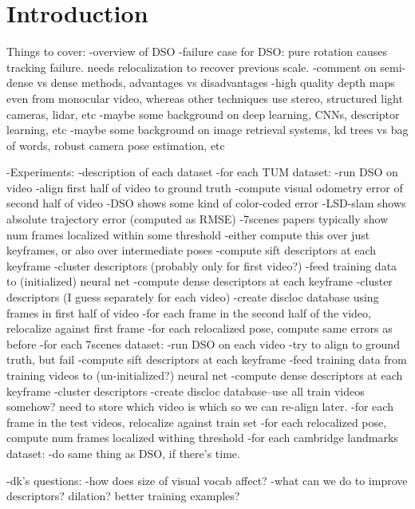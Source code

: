 \graphicspath{{introduction/}}

\chapter{Introduction}
\label{cha:introduction}


Things to cover:
-overview of DSO
-failure case for DSO: pure rotation causes tracking failure. needs relocalization to recover previous scale.
-comment on semi-dense vs dense methods, advantages vs disadvantages
	-high quality depth maps even from monocular video, whereas other techniques use stereo, structured light cameras, lidar, etc
-maybe some background on deep learning, CNNs, descriptor learning, etc
-maybe some background on image retrieval systems, kd trees vs bag of words, robust camera pose estimation, etc


-Experiments:
-description of each dataset
-for each TUM dataset:
	-run DSO on video
	-align first half of video to ground truth
	-compute visual odometry error of second half of video
		-DSO shows some kind of color-coded error
		-LSD-slam shows absolute trajectory error (computed as RMSE)
		-7scenes papers typically show num frames localized within some threshold
		-either compute this over just keyframes, or also over intermediate poses
	-compute sift descriptors at each keyframe
		-cluster descriptors (probably only for first video?)
	-feed training data to (initialized) neural net
	-compute dense descriptors at each keyframe
	    -cluster descriptors (I guess separately for each video)
	-create discloc database using frames in first half of video
    -for each frame in the second half of the video, relocalize against first frame
	    -for each relocalized pose, compute same errors as before
-for each 7scenes dataset:
	-run DSO on each video
	-try to align to ground truth, but fail
	-compute sift descriptors at each keyframe
	-feed training data from training videos to (un-initialized?) neural net
	-compute dense descriptors at each keyframe
	-cluster descriptors
	-create discloc database--use all train videos somehow? need to store which video is which so we can re-align later.
	-for each frame in the test videos, relocalize against train set
	    -for each relocalized pose, compute num frames localized withing threshold
-for each cambridge landmarks dataset:
	-do same thing as DSO, if there's time.

	
	-dk's questions:
		-how does size of visual vocab affect?
		-what can we do to improve descriptors? dilation? better training examples?

\cleardoublepage
